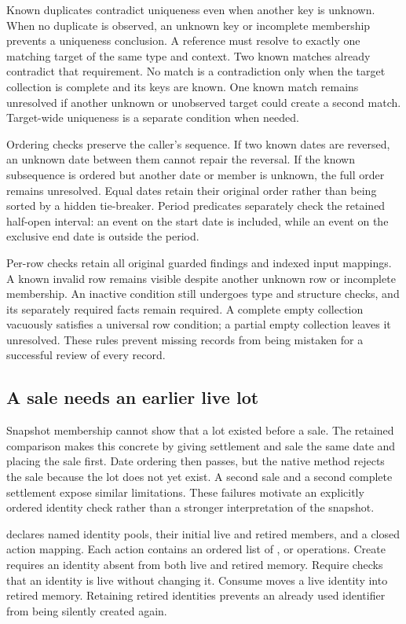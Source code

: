 Known duplicates contradict uniqueness even when another key is unknown. When
no duplicate is observed, an unknown key or incomplete membership prevents a
uniqueness conclusion. A reference must resolve to exactly one matching target
of the same type and context. Two known matches already contradict that
requirement. No match is a contradiction only when the target collection is
complete and its keys are known. One known match remains unresolved if another
unknown or unobserved target could create a second match. Target-wide uniqueness
is a separate condition when needed.

Ordering checks preserve the caller's sequence. If two known dates are reversed,
an unknown date between them cannot repair the reversal. If the known subsequence
is ordered but another date or member is unknown, the full order remains
unresolved. Equal dates retain their original order rather than being sorted
by a hidden tie-breaker. Period predicates separately check the retained
half-open interval: an event on the start date is included, while an event on
the exclusive end date is outside the period.

Per-row checks retain all original guarded findings and indexed input mappings.
A known invalid row remains visible despite another unknown row or incomplete
membership. An inactive condition still undergoes type and structure checks,
and its separately required facts remain required. A complete empty collection
vacuously satisfies a universal row condition; a partial empty collection leaves
it unresolved. These rules prevent missing records from being mistaken for a
successful review of every record.

\subsection{A sale needs an earlier live lot}

Snapshot membership cannot show that a lot existed before a sale. The retained
comparison makes this concrete by giving settlement and sale the same date and
placing the sale first. Date ordering then passes, but the native method rejects
the sale because the lot does not yet exist. A second sale and a second complete
settlement expose similar limitations. These failures motivate an explicitly
ordered identity check rather than a stronger interpretation of the snapshot.

 declares named identity pools, their initial
live and retired members, and a closed action mapping. Each action contains an
ordered list of ,  or  operations.
Create requires an identity absent from both live and retired memory. Require
checks that an identity is live without changing it. Consume moves a live
identity into retired memory. Retaining retired identities prevents an already
used identifier from being silently created again.

